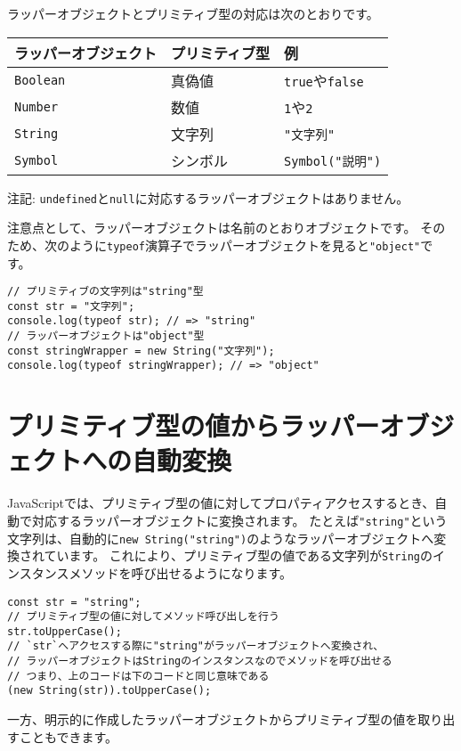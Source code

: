 ラッパーオブジェクトとプリミティブ型の対応は次のとおりです。

\begin{longtable}[]{@{}lll@{}}
\toprule
ラッパーオブジェクト & プリミティブ型 & 例\tabularnewline
\midrule
\endhead
\texttt{Boolean} & 真偽値 &
\texttt{true}や\texttt{false}\tabularnewline
\texttt{Number} & 数値 &
\texttt{1}や\texttt{2}\tabularnewline
\texttt{String} & 文字列 &
\texttt{"文字列"}\tabularnewline
\texttt{Symbol} & シンボル &
\texttt{Symbol("説明")}\tabularnewline
\bottomrule
\end{longtable}

注記:
\texttt{undefined}と\texttt{null}に対応するラッパーオブジェクトはありません。

注意点として、ラッパーオブジェクトは名前のとおりオブジェクトです。
そのため、次のように\texttt{typeof}演算子でラッパーオブジェクトを見ると\texttt{"object"}です。

\begin{lstlisting}
// プリミティブの文字列は"string"型
const str = "文字列";
console.log(typeof str); // => "string"
// ラッパーオブジェクトは"object"型
const stringWrapper = new String("文字列");
console.log(typeof stringWrapper); // => "object"
\end{lstlisting}

\hypertarget{convert-primitive-to-wrapper}{%
\section{プリミティブ型の値からラッパーオブジェクトへの自動変換}\label{convert-primitive-to-wrapper}}

JavaScriptでは、プリミティブ型の値に対してプロパティアクセスするとき、自動で対応するラッパーオブジェクトに変換されます。
たとえば\texttt{"string"}という文字列は、自動的に\texttt{new String("string")}のようなラッパーオブジェクトへ変換されています。
これにより、プリミティブ型の値である文字列が\texttt{String}のインスタンスメソッドを呼び出せるようになります。

\begin{lstlisting}
const str = "string";
// プリミティブ型の値に対してメソッド呼び出しを行う
str.toUpperCase();
// `str`へアクセスする際に"string"がラッパーオブジェクトへ変換され、
// ラッパーオブジェクトはStringのインスタンスなのでメソッドを呼び出せる
// つまり、上のコードは下のコードと同じ意味である
(new String(str)).toUpperCase();
\end{lstlisting}

一方、明示的に作成したラッパーオブジェクトからプリミティブ型の値を取り出すこともできます。

